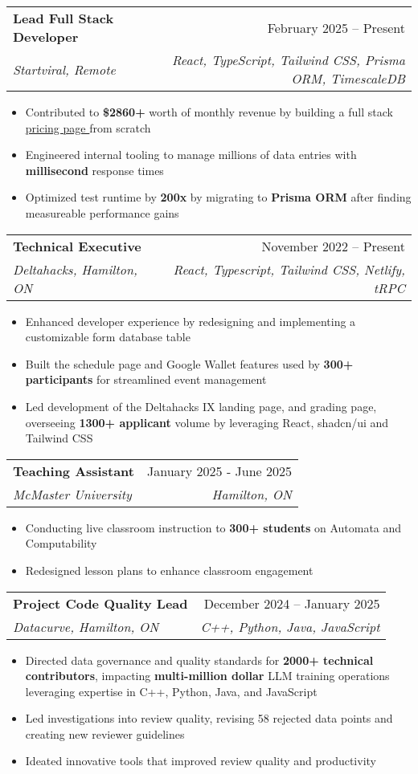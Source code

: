 \documentclass[letterpaper,11pt]{article}
\makeatletter
\newcommand{\resumeItem}[1]{
  \item\small{
    {#1 \vspace{-2pt}}
  }
}
\newcommand{\resumeSubheading}[4]{
  \vspace{-2pt}\item
    \begin{tabular*}{0.97\textwidth}[t]{l@{\extracolsep{\fill}}r}
      \textbf{#1} & #2 \\
      \textit{\small#3} & \textit{\small #4} \\
    \end{tabular*}\vspace{-7pt}
}
\newcommand{\resumeItemListStart}{\begin{itemize}}
\newcommand{\resumeItemListEnd}{\end{itemize}\vspace{-5pt}}
\makeatother
\begin{document}
\resumeSubheading
{Lead Full Stack Developer}{February 2025 -- Present}
{Startviral, Remote}{React, TypeScript, Tailwind CSS, Prisma ORM, TimescaleDB}
\resumeItemListStart
\resumeItem{Contributed to \textbf{\$2860+} worth of monthly revenue by building a full stack \href{https://pricing.startviral.de}{\underline{pricing page \faIcon{external-link-alt}}} from scratch}
\resumeItem{Engineered internal tooling to manage millions of data entries with \textbf{millisecond} response times}
\resumeItem{Optimized test runtime by \textbf{200x} by migrating to \textbf{Prisma ORM} after finding measureable performance gains}
\resumeItemListEnd

\resumeSubheading
{Technical Executive}{November 2022 -- Present}
{Deltahacks, Hamilton, ON}{React, Typescript, Tailwind CSS, Netlify, tRPC}
\resumeItemListStart
\resumeItem{Enhanced developer experience by redesigning and implementing a customizable form database table}
\resumeItem{Built the schedule page and Google Wallet features used by \textbf{300+ participants} for streamlined event management}
\resumeItem{Led development of the Deltahacks IX landing page, and grading page, overseeing \textbf{1300+ applicant} volume by leveraging React, shadcn/ui and Tailwind CSS}
\resumeItemListEnd

\resumeSubheading
{Teaching Assistant}{January 2025 - June 2025}
{McMaster University}{Hamilton, ON}
\resumeItemListStart
\resumeItem{Conducting live classroom instruction to \textbf{300+ students} on Automata and Computability}
\resumeItem{Redesigned lesson plans to enhance classroom engagement}
\resumeItemListEnd

\resumeSubheading
{Project Code Quality Lead}{December 2024 -- January 2025}
{Datacurve, Hamilton, ON}{C++, Python, Java, JavaScript}
\resumeItemListStart
\resumeItem{Directed data governance and quality standards for \textbf{2000+ technical contributors}, impacting \textbf{multi-million dollar} LLM training operations leveraging expertise in C++, Python, Java, and JavaScript}
\resumeItem{Led investigations into review quality, revising 58 rejected data points and creating new reviewer guidelines}
\resumeItem{Ideated innovative tools that improved review quality and productivity}
\resumeItemListEnd

\end{document}
